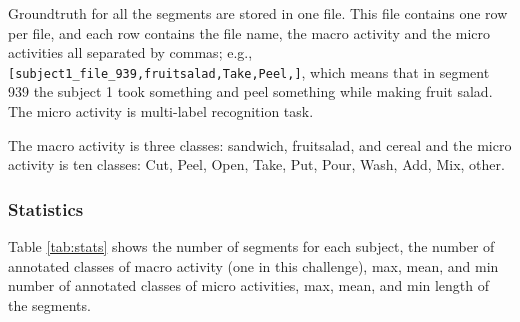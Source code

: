 \documentclass{svmult}
\begin{document}
Groundtruth for all the segments are stored in one file. This file contains one row per file, and each row contains the file name, the macro activity and the micro activities all separated by commas; e.g., {\tt [subject1\verb|_|file\verb|_|939,fruitsalad,Take,Peel,]}, which means that in segment 939 the subject 1 took something and peel something while making fruit salad. The micro activity is multi-label recognition task.

The macro activity is three classes: sandwich, fruitsalad, and cereal and the micro activity is ten classes: Cut, Peel, Open, Take, Put, Pour, Wash, Add, Mix, other.

\subsubsection{Statistics}
Table \ref{tab:stats} shows the number of segments for each subject, the number of annotated classes of macro activity (one in this challenge), max, mean, and min number of annotated classes of micro activities, max, mean, and min length of the segments.
\end{document}
